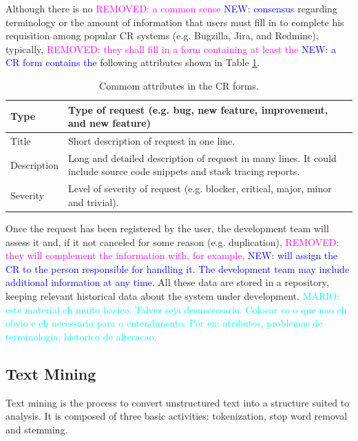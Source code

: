 \documentclass[10pt, conference]{IEEEtran}
\newcommand{\mario}[1]{\noindent\textcolor{cyan}{MARIO: {#1}}}
\newcommand{\rem}[1]{\noindent\textcolor{magenta}{REMOVED: {#1}}}
\newcommand{\new}[1]{\noindent\textcolor{blue}{NEW: {#1}}}
\newcommand{\mario}[1]{}
\newcommand{\rem}[1]{}
\newcommand{\new}[1]{#1}
\begin{document}
Although there is no \rem{a common sense} \new{consensus} regarding terminology or the amount of information that users must fill in to complete his requisition among popular CR systems (e.g. Bugzilla, Jira, and Redmine)\cite{Tian2012}, typically, \rem{they shall fill in a form containing at least the} \new{a CR form contains the} following attributes shown in Table \ref{tab:commom_attributes_cr_form}. 

\begin{table}[!ht]
	\renewcommand{\arraystretch}{1.3}
	\caption{Commom attributes in the CR forms.}
	\label{tab:commom_attributes_cr_form}
	\centering
	\begin{tabular}{|l|p{6cm}|}
		\hline
		Type & Type of request (e.g. bug, new feature, improvement, and new feature)\\
		\hline
		Title & Short description of request in one line.\\
		\hline
		Description & Long and detailed description of request in many lines. It could include source code snippets and stack tracing reports.\\
		\hline
		Severity & Level of severity of request (e.g. blocker, critical, major, minor and trivial).\\
		\hline 
	\end{tabular}
\end{table}

Once the request has been registered by the user, the development team will assess it and, if it not canceled for some reason (e.g. duplication), \rem{they will complement the information with, for example, } \new{will assign the CR to the person responsible for handling it. The development team may include additional information at any time.} All these data are stored in a repository, keeping relevant historical data about the system under development. \mario{este material eh muito basico. Talvez seja desnecessario. Colocar so o que nao eh obvio e eh necessario para o entendimento. Por ex: atributos, problemas de terminologia, historico de alteracao.}

\subsection{Text Mining}   \label{subsec:texmining}
Text mining is the process to convert unstructured text into a structure suited to analysis\cite{Feldman2007}. It is composed of three basic activities\cite{Williams2011}: tokenization, stop word removal and stemming.
\end{document}
